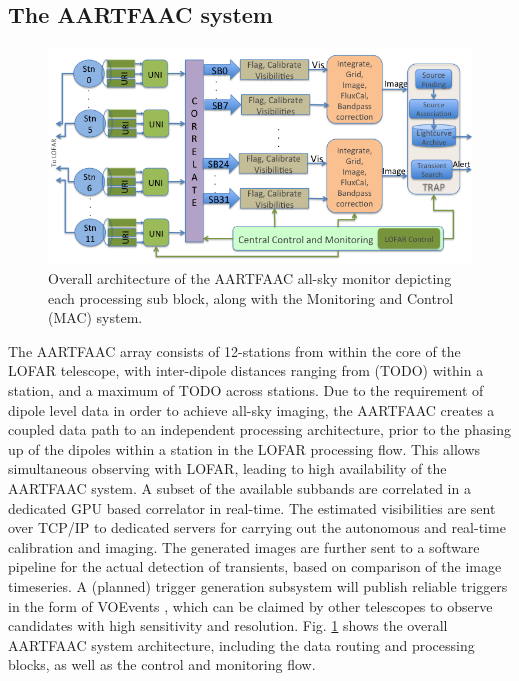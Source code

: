 \documentclass{ws-jai}
\begin{document}
\subsection {\label{subsec:aartfaac}  The AARTFAAC system}
\begin{figure}[htbp]
\centering
\includegraphics[width=1\textwidth]{Figs/Overall_arch_afaac/Slide1.png}
\caption {Overall  architecture of the  AARTFAAC all-sky monitor  depicting each
  processing sub block, along with the Monitoring and Control (MAC) system. }
\label{fig:afaac_arch}
\end{figure}

The AARTFAAC  array consists of  12-stations from within  the core of  the LOFAR
telescope, with inter-dipole distances ranging  from (TODO) within a station, and
a maximum of TODO across stations.  Due  to the requirement of dipole level data
in order to achieve all-sky imaging, the AARTFAAC creates a coupled data path to
an independent processing  architecture, prior to the phasing up  of the dipoles
within  a  station in  the  LOFAR  processing  flow.  This  allows  simultaneous
observing with  LOFAR, leading to  high availability  of the AARTFAAC  system. A
subset  of the  available  subbands  are correlated  in  a  dedicated GPU  based
correlator in  real-time.  The  estimated visibilities are  sent over  TCP/IP to
dedicated servers for carrying out  the autonomous and real-time calibration and
imaging.  The generated  images are further sent to a  software pipeline for the
actual detection of transients, based on  comparison of the image timeseries.  A
(planned) trigger  generation subsystem  will publish  reliable triggers  in the
form  of VOEvents  \cite{williams2006voevent},  which can  be  claimed by  other
telescopes    to    observe    candidates     with    high    sensitivity    and
resolution.  Fig.   \ref{fig:afaac_arch}  shows  the  overall   AARTFAAC  system
architecture, including the  data routing and processing blocks, as  well as the
control and monitoring flow.
\end{document}
